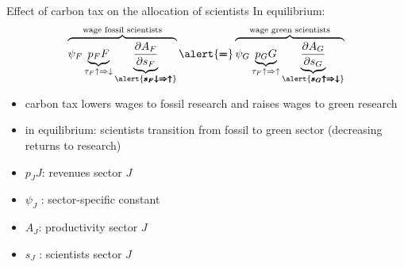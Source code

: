\documentclass[11pt,aspectratio=169]{beamer}
\begin{document}
\begin{frame}{Effect of carbon tax on the allocation of scientists}
\vspace{2mm}
In equilibrium: \large
\begin{align*}
	\overbrace{{\psi_F} \underbrace{p_F{F}}_{\tau_F\uparrow\Rightarrow\downarrow}\underbrace{\frac{\partial A_{F}}{\partial s_{F}}}_{\alert{\pmb{s_F\downarrow\Rightarrow\uparrow}}}}^{\text{wage fossil scientists}}\alert{\pmb{=}}\overbrace{{\psi_G} \underbrace{p_G{G}}_{\tau_F\uparrow\Rightarrow\uparrow}\underbrace{\frac{\partial A_{G}}{\partial s_{G}}}_{\alert{\pmb{s_G\uparrow\Rightarrow\downarrow}}}}^{\text{wage green scientists}}
\end{align*}
\normalsize
\begin{itemize}
	\item carbon tax lowers wages to fossil research and raises wages to green research
	\vspace{2mm}
	\item in equilibrium: scientists transition from fossil to green sector \small{(decreasing returns to research)}
\end{itemize}
\small
\vspace{4mm}
\hspace{-2mm}
\begin{minipage}[t!]{0.4\textwidth}
	\vspace{0mm}
	\begin{itemize}
		\item[] $p_JJ$: revenues sector $J$
		\vspace{-2mm}
		\item[] $\psi_J$ : sector-specific constant
	\end{itemize}
\end{minipage}
\vspace{-5mm}
\begin{minipage}[t!]{0.5\textwidth}
	\vspace{0mm}
	\begin{itemize}	
		\item[] $A_J$: productivity sector $J$
		\vspace{-2mm}			
		\item[] $s_J$ : scientists sector $J$
	\end{itemize}
\end{minipage}
\end{frame}
\end{document}
